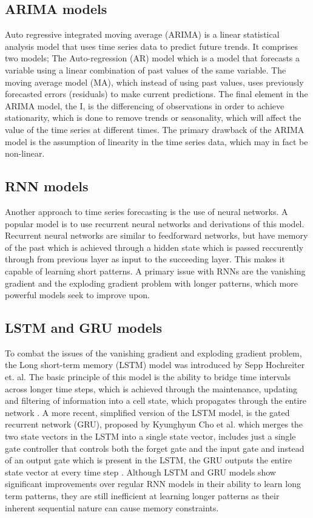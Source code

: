 \subsection{ARIMA models}
Auto regressive integrated moving average (ARIMA) is a linear statistical analysis model that uses time series data to predict future trends. It comprises two models; The Auto-regression (AR) model which is a model that forecasts a variable using a linear combination of past values of the same variable. The moving average model (MA), which instead of using past values, uses previously forecasted errors (residuals) to make current predictions. 
The final element in the ARIMA model, the I, is the differencing of observations in order to achieve stationarity, which is done to remove trends or seasonality, which will affect the value of the time series at different times. The primary drawback of the ARIMA model is the assumption of linearity in the time series data, which may in fact be non-linear.\cite{HybridArimaAndNN}\cite{ForecastinPrinciplesAndPractice}

\subsection{RNN models}
Another approach to time series forecasting is the use of neural networks. A popular model is to use recurrent neural networks and derivations of this model. Recurrent neural networks are similar to feedforward networks, but have memory of the past which is achieved through a hidden state which is passed reccurently through from previous layer as input to the succeeding layer. This makes it capable of learning short patterns. 
A primary issue with RNNs are the vanishing gradient and the exploding gradient problem with longer patterns, which more powerful models seek to improve upon. \cite{AIModernApproach}\cite{hands-onML}

\subsection{LSTM and GRU models}
To combat the issues of the vanishing gradient and exploding gradient problem, the Long short-term memory (LSTM) model was introduced by Sepp Hochreiter et. al. The basic principle of this model is the ability to bridge time intervals across longer time steps, which is achieved through the maintenance, updating and filtering of information into a cell state, which propagates through the entire network \cite{LSTMPaper}. 
A more recent, simplified version of the LSTM model, is the gated recurrent network (GRU), proposed by Kyunghyun Cho et al. which merges the two state vectors in the LSTM into a single state vector, includes just a single gate controller that controls both the forget gate and the input gate and instead of an output gate which is present in the LSTM, the GRU outputs the entire state vector at every time step\cite{RNNPaper} \cite{hands-onML}.
Although LSTM and GRU models show significant improvements over regular RNN models in their ability to learn long term patterns, they are still inefficient at learning longer patterns as their inherent sequential nature can cause memory constraints\cite{AttentionIsAllYouNeed}. 
